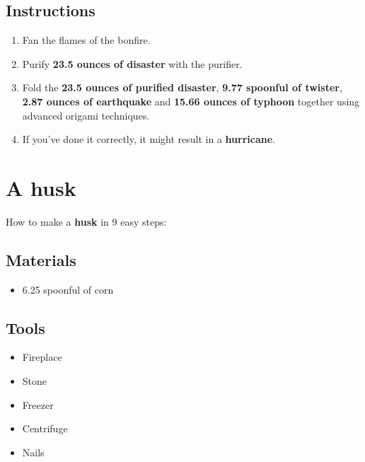 \documentclass{article}
\begin{document}
\subsection{Instructions}\begin{enumerate}
\item 
Fan the flames of the bonfire.
\item 
Purify \textbf{23.5 ounces of disaster} with the purifier.
\item 
Fold the \textbf{23.5 ounces of purified disaster}, \textbf{9.77 spoonful of twister}, \textbf{2.87 ounces of earthquake} and \textbf{15.66 ounces of typhoon} together using advanced origami techniques.
\item 
If you've done it correctly, it might result in a \textbf{hurricane}.
\end{enumerate}
\newpage
\section{A husk}How to make a \textbf{husk} in 9 easy steps:

\subsection{Materials}\begin{itemize}
\item 
6.25 spoonful of corn
\end{itemize}
\subsection{Tools}\begin{itemize}
\item 
Fireplace
\item 
Stone
\item 
Freezer
\item 
Centrifuge
\item 
Nails
\end{itemize}
\end{document}
